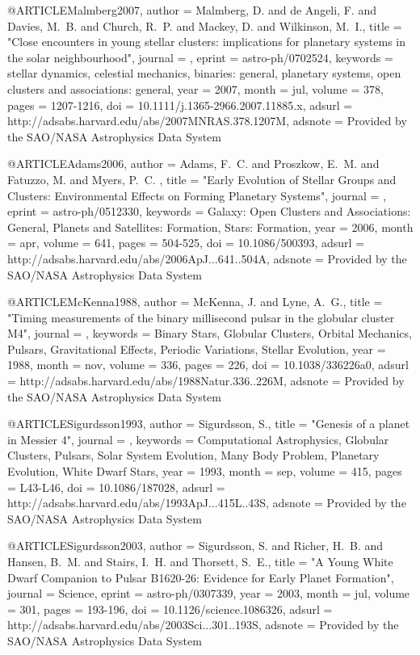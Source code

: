 \documentclass[twocolumn,tighten]{aastex63}
\begin{document}
{@ARTICLE{Malmberg2007,
   author = {{Malmberg}, D. and {de Angeli}, F. and {Davies}, M.~B. and {Church}, R.~P. and 
	{Mackey}, D. and {Wilkinson}, M.~I.},
    title = "{Close encounters in young stellar clusters: implications for planetary systems in the solar neighbourhood}",
  journal = {\mnras},
   eprint = {astro-ph/0702524},
 keywords = {stellar dynamics, celestial mechanics, binaries: general, planetary systems, open clusters and associations: general},
     year = 2007,
    month = jul,
   volume = 378,
    pages = {1207-1216},
      doi = {10.1111/j.1365-2966.2007.11885.x},
   adsurl = {http://adsabs.harvard.edu/abs/2007MNRAS.378.1207M},
  adsnote = {Provided by the SAO/NASA Astrophysics Data System}
}

@ARTICLE{Adams2006,
   author = {{Adams}, F.~C. and {Proszkow}, E.~M. and {Fatuzzo}, M. and {Myers}, P.~C.
	},
    title = "{Early Evolution of Stellar Groups and Clusters: Environmental Effects on Forming Planetary Systems}",
  journal = {\apj},
   eprint = {astro-ph/0512330},
 keywords = {Galaxy: Open Clusters and Associations: General, Planets and Satellites: Formation, Stars: Formation},
     year = 2006,
    month = apr,
   volume = 641,
    pages = {504-525},
      doi = {10.1086/500393},
   adsurl = {http://adsabs.harvard.edu/abs/2006ApJ...641..504A},
  adsnote = {Provided by the SAO/NASA Astrophysics Data System}
}

@ARTICLE{McKenna1988,
   author = {{McKenna}, J. and {Lyne}, A.~G.},
    title = "{Timing measurements of the binary millisecond pulsar in the globular cluster M4}",
  journal = {\nat},
 keywords = {Binary Stars, Globular Clusters, Orbital Mechanics, Pulsars, Gravitational Effects, Periodic Variations, Stellar Evolution},
     year = 1988,
    month = nov,
   volume = 336,
    pages = {226},
      doi = {10.1038/336226a0},
   adsurl = {http://adsabs.harvard.edu/abs/1988Natur.336..226M},
  adsnote = {Provided by the SAO/NASA Astrophysics Data System}
}

@ARTICLE{Sigurdsson1993,
   author = {{Sigurdsson}, S.},
    title = "{Genesis of a planet in Messier 4}",
  journal = {\apjl},
 keywords = {Computational Astrophysics, Globular Clusters, Pulsars, Solar System Evolution, Many Body Problem, Planetary Evolution, White Dwarf Stars},
     year = 1993,
    month = sep,
   volume = 415,
    pages = {L43-L46},
      doi = {10.1086/187028},
   adsurl = {http://adsabs.harvard.edu/abs/1993ApJ...415L..43S},
  adsnote = {Provided by the SAO/NASA Astrophysics Data System}
}

@ARTICLE{Sigurdsson2003,
   author = {{Sigurdsson}, S. and {Richer}, H.~B. and {Hansen}, B.~M. and 
	{Stairs}, I.~H. and {Thorsett}, S.~E.},
    title = "{A Young White Dwarf Companion to Pulsar B1620-26: Evidence for Early Planet Formation}",
  journal = {Science},
   eprint = {astro-ph/0307339},
     year = 2003,
    month = jul,
   volume = 301,
    pages = {193-196},
      doi = {10.1126/science.1086326},
   adsurl = {http://adsabs.harvard.edu/abs/2003Sci...301..193S},
  adsnote = {Provided by the SAO/NASA Astrophysics Data System}
}

}
\end{document}
